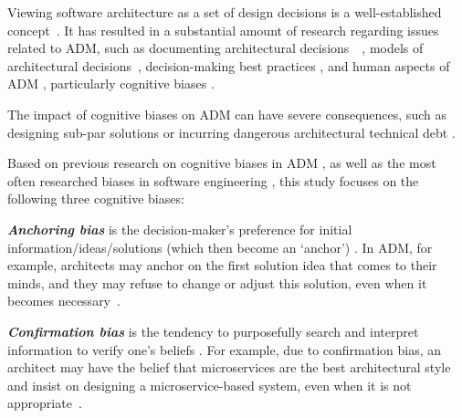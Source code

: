     Viewing software architecture as a set of design decisions is a well-established concept~\cite{jansen2005software}. It has resulted in a substantial amount of research regarding issues related to ADM, such as documenting architectural decisions~~\cite{vanHeesch2012documentation}, models of architectural decisions~\cite{zimmermann2009managing}, decision-making best practices \cite{Tang2021}, and human aspects of ADM \cite{Tang2017}, particularly cognitive biases \cite{VanVliet2016}.

    The impact of cognitive biases on ADM can have severe consequences, such as designing sub-par solutions \cite{Manjunath2018a} or incurring dangerous architectural technical debt \cite{Borowa2021b}.

    Based on previous research on cognitive biases in ADM \cite{VanVliet2016,Zalewski2017,Borowa2021b}, as well as the most often researched biases in software engineering \cite{Mohanani2018}, this study focuses on the following three cognitive biases: %

    \textbf{\textit{Anchoring bias}} is the decision-maker's preference for initial information/ideas/so\-lu\-tions (which then become an `anchor') \cite{Tversky1974}. 
    \color{black}
    In ADM, for example, architects may anchor on the first solution idea that comes to their minds, and they may refuse to change or adjust this solution, even when it becomes necessary~\cite{Tang2011}.
    \color{black}

    \textbf{\textit{Confirmation bias}} is the tendency to purposefully search and interpret information to verify one's beliefs \cite{nickerson1998confirmation}. 
\color{black}
    For example, due to confirmation bias, an architect may have the belief that microservices are the best architectural style and insist on designing a microservice-based system, even when it is not appropriate~\cite{Zalewski2017}.
    \color{black}
    
